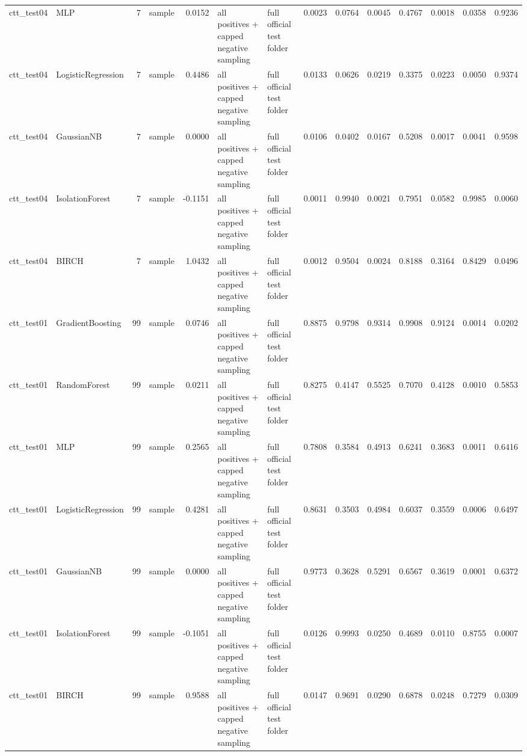 \begin{tabular}{llrlrllrrrrrrr}
ctt\_test04 & MLP & 7 & sample & 0.0152 & all positives + capped negative sampling & full official test folder & 0.0023 & 0.0764 & 0.0045 & 0.4767 & 0.0018 & 0.0358 & 0.9236 \\
ctt\_test04 & LogisticRegression & 7 & sample & 0.4486 & all positives + capped negative sampling & full official test folder & 0.0133 & 0.0626 & 0.0219 & 0.3375 & 0.0223 & 0.0050 & 0.9374 \\
ctt\_test04 & GaussianNB & 7 & sample & 0.0000 & all positives + capped negative sampling & full official test folder & 0.0106 & 0.0402 & 0.0167 & 0.5208 & 0.0017 & 0.0041 & 0.9598 \\
ctt\_test04 & IsolationForest & 7 & sample & -0.1151 & all positives + capped negative sampling & full official test folder & 0.0011 & 0.9940 & 0.0021 & 0.7951 & 0.0582 & 0.9985 & 0.0060 \\
ctt\_test04 & BIRCH & 7 & sample & 1.0432 & all positives + capped negative sampling & full official test folder & 0.0012 & 0.9504 & 0.0024 & 0.8188 & 0.3164 & 0.8429 & 0.0496 \\
ctt\_test01 & GradientBoosting & 99 & sample & 0.0746 & all positives + capped negative sampling & full official test folder & 0.8875 & 0.9798 & 0.9314 & 0.9908 & 0.9124 & 0.0014 & 0.0202 \\
ctt\_test01 & RandomForest & 99 & sample & 0.0211 & all positives + capped negative sampling & full official test folder & 0.8275 & 0.4147 & 0.5525 & 0.7070 & 0.4128 & 0.0010 & 0.5853 \\
ctt\_test01 & MLP & 99 & sample & 0.2565 & all positives + capped negative sampling & full official test folder & 0.7808 & 0.3584 & 0.4913 & 0.6241 & 0.3683 & 0.0011 & 0.6416 \\
ctt\_test01 & LogisticRegression & 99 & sample & 0.4281 & all positives + capped negative sampling & full official test folder & 0.8631 & 0.3503 & 0.4984 & 0.6037 & 0.3559 & 0.0006 & 0.6497 \\
ctt\_test01 & GaussianNB & 99 & sample & 0.0000 & all positives + capped negative sampling & full official test folder & 0.9773 & 0.3628 & 0.5291 & 0.6567 & 0.3619 & 0.0001 & 0.6372 \\
ctt\_test01 & IsolationForest & 99 & sample & -0.1051 & all positives + capped negative sampling & full official test folder & 0.0126 & 0.9993 & 0.0250 & 0.4689 & 0.0110 & 0.8755 & 0.0007 \\
ctt\_test01 & BIRCH & 99 & sample & 0.9588 & all positives + capped negative sampling & full official test folder & 0.0147 & 0.9691 & 0.0290 & 0.6878 & 0.0248 & 0.7279 & 0.0309 \\

\end{tabular}
